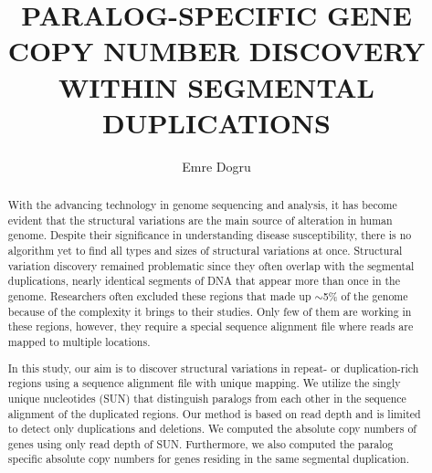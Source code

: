 \documentclass{buthesis}
\title{PARALOG-SPECIFIC GENE COPY NUMBER DISCOVERY WITHIN SEGMENTAL DUPLICATIONS}
\author{Emre Dogru}
\begin{document}
\titlepageMS %
\signaturepageMS %

\thispagestyle{plain}
\begin{abstract}
With the advancing technology in genome sequencing and analysis, it has become evident that the structural variations are the main source of alteration in human genome. Despite their significance in understanding disease susceptibility, there is no algorithm yet to find all types and sizes of structural variations at once. Structural variation discovery remained problematic since they often overlap with the segmental duplications, nearly identical segments of DNA that appear more than once in the genome. Researchers often excluded these regions that made up $\sim$5\% of the genome because of the complexity it brings to their studies. Only few of them are working in these regions, however, they require a special sequence alignment file where reads are mapped to multiple locations.

In this study, our aim is to discover structural variations in repeat- or duplication-rich regions using a sequence alignment file with unique mapping. We utilize the singly unique nucleotides (SUN) that distinguish paralogs from each other in the sequence alignment of the duplicated regions. Our method is based on read depth and is limited to detect only duplications and deletions. We computed the absolute copy numbers of genes using only read depth of SUN. Furthermore, we also computed the paralog specific absolute copy numbers for genes residing in the same segmental duplication.


\end{abstract}
\end{document}
